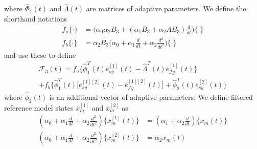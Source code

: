 \documentclass[english]{ifacconf}
\begin{document}
where $\hat{\Phi}_1(t)$ and $\hat{\Lambda}(t)$ are matrices of adaptive parameters. We define the shorthand notations
\begin{equation}
\begin{aligned}
	f_a \{ \cdot \} &= \big(\alpha_0 \alpha_2 B_3 + (\alpha_1 B_3 + \alpha_2 A B_3)\frac{d}{dt} \big) \{ \cdot \} \\
	f_b \{ \cdot \} &= \alpha_2 B_3 \big(\alpha_0 + \alpha_1 \frac{d}{dt} + \alpha_2 \frac{d^2}{dt^2} \big) \{ \cdot \}
\end{aligned}
\end{equation}
and use these to define
\begin{multline}
	\mathcal{F}_3(t) = f_a \big \{ \hat{\phi}_1^T(t) \overline{e}_{sy}^{[1]}(t) - \hat{\Lambda}^T(t) \overline{e}_{\mathcal{I}y}^{[1]} (t) \big \} \\
	+ f_b \big \{ \hat{\phi}_1^T(t) \big[\overline{e}_{sy}^{[1][2]}(t) -  \overline{e}_{\mathcal{I}y}^{[1][2]} (t) \big ] + \hat{\phi}_2^T (t) \overline{e}_{sy}^{[2]}(t) \big \}
\end{multline}
where $\hat{\phi}_2(t)$ is an additional vector of adaptive parameters. We define filtered reference model states $\overline{x}_m^{[1]}$ and $\overline{x}_m^{[2]}$ as
\begin{equation}
\begin{aligned}
	(\alpha_0 + \alpha_1 \frac{d}{dt} + \alpha_2 \frac{d^2}{dt^2} )\big \{  \overline{x}_{m}^{[1]} (t) \big \} &= (\alpha_1 + \alpha_2 \frac{d}{dt}) \big \{ x_m (t) \big \} \\
	(\alpha_0 + \alpha_1 \frac{d}{dt} + \alpha_2 \frac{d^2}{dt^2} )\big \{  \overline{x}_{m}^{[2]}(t) \big \} &= \alpha_2 x_m (t)
\end{aligned}	
\end{equation}
\end{document}
